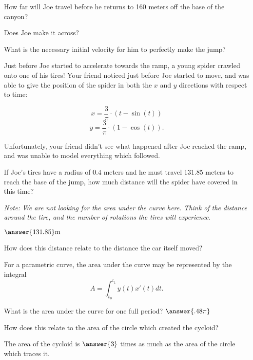 \documentclass{ximera}
\begin{document}
\begin{question}
How far will Joe travel before he returns to 160 meters off the base of the canyon?
\begin{multipleChoice}
\end{multipleChoice}

Does Joe make it across?
\begin{multipleChoice}
\end{multipleChoice}

What is the necessary initial velocity for him to perfectly make the jump?
\begin{multipleChoice}
\end{multipleChoice}

\end{question}
\begin{question}
Just before Joe started to accelerate towards the ramp, a young spider crawled onto one of his tires! Your friend noticed just before Joe started to move, and was able to give the position of the spider in both the $x$ and $y$ directions with respect to time:

$$x = \dfrac{3}{\pi} \cdot (t - \sin(t))$$ $$y = \dfrac{3}{\pi} \cdot (1 - \cos(t))\text{.}$$

Unfortunately, your friend didn't see what happened after Joe reached the ramp, and was unable to model everything which followed.

If Joe's tires have a radius of $0.4$ meters and he must travel 131.85 meters to reach the base of the jump, how much distance will the spider have covered in this time?

\textit{Note: We are not looking for the area under the curve here. Think of the distance around the tire, and the number of rotations the tires will experience.}

$\answer{131.85} \text{m}$

How does this distance relate to the distance the car itself moved?
\begin{multipleChoice}
\end{multipleChoice}

For a parametric curve, the area under the curve may be represented by the integral $$A = \int_{t_0}^{t_1} y(t)x'(t) dt \text{.}$$

What is the area under the curve for one full period?
$\answer{.48\pi}$


How does this relate to the area of the circle which created the cycloid?
\begin{center}
The area of the cycloid is $\answer{3}$ times as much as the area of the circle which traces it.
\end{center}
\end{question}
\end{document}
